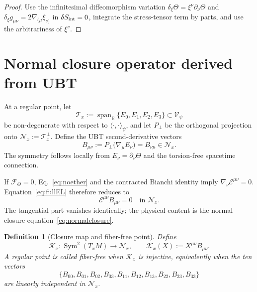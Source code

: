 \documentclass[11pt,a4paper]{article}
\newtheorem{definition}{Definition}[section]
\theoremstyle{remark}
\newcommand{\E}{\mathscr E}
\newcommand{\F}{\mathscr F}
\begin{document}
\begin{proof}
Use the infinitesimal diffeomorphism variation
$\delta_\xi\Theta=\xi^\nu\partial_\nu\Theta$ and
$\delta_\xi g_{\mu\nu}=2\nabla_{(\mu}\xi_{\nu)}$ in
$\delta S_{\rm int}=0$, integrate the stress-tensor term by parts, and use the
arbitrariness of $\xi^\nu$.
\end{proof}

\section{Normal closure operator derived from UBT}

At a regular point, let
\begin{equation}
  \mathscr T_x:=\operatorname{span}_{\mathbb R}\{E_0,E_1,E_2,E_3\}
  \subset\mathscr V_\psi
\end{equation}
be non-degenerate with respect to $\langle\cdot,\cdot\rangle_\psi$, and let
$P_\perp$ be the orthogonal projection onto
$\mathscr N_x:=\mathscr T_x^\perp$.  Define the UBT second-derivative vectors
\begin{equation}
  B_{\mu\nu}
  :=P_\perp\bigl(\nabla_\mu E_\nu\bigr)
  =B_{\nu\mu}\in\mathscr N_x.
  \label{eq:Bmunu}
\end{equation}
The symmetry follows locally from $E_\nu=\partial_\nu\Theta$ and the
torsion-free spacetime connection.

If $\F_\Theta=0$, Eq.~\eqref{eq:noether} and the contracted Bianchi identity
imply $\nabla_\nu\E^{\mu\nu}=0$.  Equation~\eqref{eq:fullEL} therefore reduces
to
\begin{equation}
  \boxed{\E^{\mu\nu}B_{\mu\nu}=0\quad\text{in }\mathscr N_x.}
  \label{eq:normalclosure}
\end{equation}
The tangential part vanishes identically; the physical content is the normal
closure equation~\eqref{eq:normalclosure}.

\begin{definition}[Closure map and fiber-free point]
Define
\begin{equation}
  \mathcal K_x:\operatorname{Sym}^2(T_xM)\longrightarrow\mathscr N_x,
  \qquad
  \mathcal K_x(X):=X^{\mu\nu}B_{\mu\nu}.
  \label{eq:Kmap}
\end{equation}
A regular point is called \emph{fiber-free} when $\mathcal K_x$ is injective,
equivalently when the ten vectors
\begin{equation}
  \{B_{00},B_{01},B_{02},B_{03},B_{11},B_{12},B_{13},B_{22},B_{23},B_{33}\}
  \label{eq:tenB}
\end{equation}
are linearly independent in $\mathscr N_x$.
\end{definition}
\end{document}
